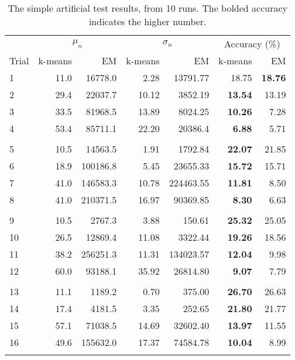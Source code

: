 \documentclass{journal}
\begin{document}
\begin{table}[hp]
\centering{}
\caption{The simple artificial test results, from 10 runs. The bolded
         accuracy indicates the higher number.}\label{tab:results}
\begin{tabular}{lrrrrrr}
    &
    \multicolumn{2}{c}{$\mu_n$} &
    \multicolumn{2}{c}{$\sigma_n$} &
    \multicolumn{2}{c}{Accuracy (\%)} \\
    \cmidrule(r){2-7}
    Trial & k-means & EM & k-means & EM & k-means & EM\\
    \midrule
    1 & 11.0 & 16778.0 & 2.28 & 13791.77 & 18.75 & \textbf{18.76}\\
    2 & 29.4 & 22037.7 & 10.12 & 3852.19 & \textbf{13.54} & 13.19 \\
    3 & 33.5 & 81968.5 & 13.89 & 8024.25 & \textbf{10.26} & 7.28 \\
    4 & 53.4 & 85711.1 & 22.20 & 20386.4 & \textbf{6.88} & 5.71 \\ \\

    5 & 10.5 & 14563.5 & 1.91 & 1792.84 & \textbf{22.07} & 21.85 \\
    6 & 18.9 & 100186.8 & 5.45 & 23655.33 & \textbf{15.72} & 15.71 \\
    7 & 41.0 & 146583.3 & 10.78 & 224463.55 & \textbf{11.81} & 8.50 \\
    8 & 41.0 & 210371.5 & 16.97 & 90369.85 & \textbf{8.30} & 6.63 \\ \\

    9 & 10.5 & 2767.3 & 3.88 & 150.61 & \textbf{25.32} & 25.05 \\
    10 & 26.5 & 12869.4 & 11.08 & 3322.44 & \textbf{19.26} & 18.56 \\
    11 & 38.2 & 256251.3 & 11.31 & 134023.57 & \textbf{12.04} & 9.98 \\
    12 & 60.0 & 93188.1 & 35.92 & 26814.80 & \textbf{9.07} & 7.79 \\ \\

    13 & 11.1 & 1189.2 & 0.70 & 375.00 & \textbf{26.70} & 26.63 \\
    14 & 17.4 & 4181.5 & 3.35 & 252.65 & \textbf{21.80} & 21.77 \\
    15 & 57.1 & 71038.5 & 14.69 & 32602.40 & \textbf{13.97} & 11.55 \\
    16 & 49.6 & 155632.0 & 17.37 & 74584.78 & \textbf{10.04} & 8.99 \\ \\


\end{tabular}
\end{table}
\end{document}
